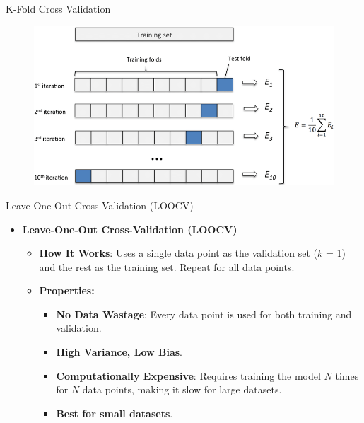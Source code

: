 \documentclass[serif, aspectratio=169]{beamer}
\begin{document}
\begin{frame}{K-Fold Cross Validation}
    \begin{figure}
        \centering
        \includegraphics[width=.8\textwidth]{pic/Figure_28.png}
    \end{figure}
    \vfill
\end{frame}


\begin{frame}{Leave-One-Out Cross-Validation (LOOCV)}
    \begin{itemize}
        \item \textbf{Leave-One-Out Cross-Validation (LOOCV)}
            \medskip
            \begin{itemize}\itemsep1em
            \item \justifying \textbf{How It Works}:
            Uses a single data point as the validation set ($k$ = 1) and the rest as the training set. Repeat for all data points.
            \item \textbf{Properties:}
            \smallskip
            \begin{itemize}\itemsep.5em
                \item \textbf{No Data Wastage}:
                Every data point is used for both training and validation.
                \item \textbf{High Variance, Low Bias}.
                \item \justifying \textbf{Computationally Expensive}: 
                Requires training the model $N$ times for $N$ data points, making it slow for large datasets.
                \item \textbf{Best for small datasets}.
            \end{itemize}
        \end{itemize}
    \end{itemize}
\end{frame}
\end{document}
